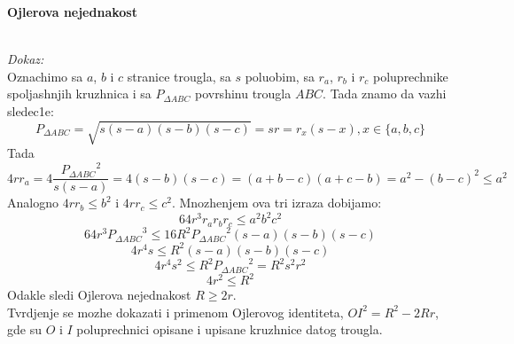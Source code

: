 \documentclass[11pt,letter]{report}
\newcommand{\D}{\displaystyle}
\begin{document}
\vspace{1cm}
\begin{center}
    \LARGE\textbf{Ojlerova nejednakost}
\end{center}
\begin{flushleft}
\\
\vspace{0.5cm}
\textit{Dokaz:}\\
\vspace{0.5cm}
Oznachimo sa $a$, $b$ i $c$ stranice trougla, sa $s$ poluobim, sa $r_a$, $r_b$ i $r_c$ poluprechnike spoljashnjih kruzhnica i sa $P_{\Delta ABC}$ povrshinu trougla $ABC$. Tada znamo da vazhi sledec1e:
$$P_{\Delta ABC}=\sqrt{s(s-a)(s-b)(s-c)}=sr=r_x(s-x),x\in \{a,b,c\}$$ Tada
$$\D 4rr_a=4\frac{{P_{\Delta ABC}}^2}{s(s-a)}=4(s-b)(s-c)=(a+b-c)(a+c-b)=a^2-(b-c)^2\leq a^2$$
Analogno $4rr_b\leq b^2$ i $4rr_c\leq c^2$. Mnozhenjem ova tri izraza dobijamo:
$$\D 64r^3r_a r_b r_c\leq a^2b^2c^2$$
$$\D 64r^3{P_{\Delta ABC}}^3\leq 16R^2{P_{\Delta ABC}}^2(s-a)(s-b)(s-c)$$
$$\D 4r^4s\leq R^2(s-a)(s-b)(s-c)$$
$$\D 4r^4s^2\leq R^2 {P_{\Delta ABC}}^2=R^2s^2r^2$$
$$\D 4r^2\leq R^2$$
Odakle sledi Ojlerova nejednakost $R\geq 2r$.\\
\vspace{0.5cm}
Tvrdjenje se mozhe dokazati i primenom Ojlerovog identiteta, $OI^2 = R^2 - 2Rr$, gde su $O$ i $I$ poluprechnici opisane i upisane kruzhnice datog trougla.



\end{flushleft}
\end{document}
